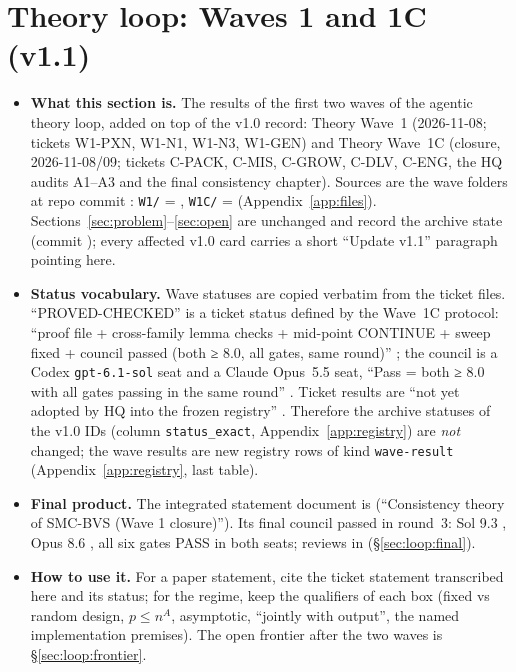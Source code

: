 \section{Theory loop: Waves 1 and 1C (v1.1)}\label{sec:loop}

\begin{agentnote}
\begin{itemize}
\item \textbf{What this section is.} The results of the first two waves of the agentic theory loop, added on top of the v1.0 record: Theory Wave~1 (2026-11-08; tickets W1-PXN, W1-N1, W1-N3, W1-GEN) and Theory Wave~1C (closure, 2026-11-08/09; tickets C-PACK, C-MIS, C-GROW, C-DLV, C-ENG, the HQ audits A1--A3 and the final consistency chapter). Sources are the wave folders at repo commit \texttt{\wavecommit}: \texttt{W1/} = , \texttt{W1C/} =  (Appendix~\ref{app:files}). Sections~\ref{sec:problem}--\ref{sec:open} are unchanged and record the archive state (commit \texttt{\sourcecommit}); every affected v1.0 card carries a short ``Update v1.1'' paragraph pointing here.
\item \textbf{Status vocabulary.} Wave statuses are copied verbatim from the ticket files. ``PROVED-CHECKED'' is a ticket status defined by the Wave~1C protocol: ``proof file + cross-family lemma checks + mid-point CONTINUE + sweep fixed + council passed (both ≥ 8.0, all gates, same round)'' ; the council is a Codex \texttt{gpt-6.1-sol} seat and a Claude Opus~5.5 seat, ``Pass = both ≥ 8.0 with all gates passing in the same round'' . Ticket results are ``not yet adopted by HQ into the frozen registry'' . Therefore the archive statuses of the v1.0 IDs (column \texttt{status\_exact}, Appendix~\ref{app:registry}) are \emph{not} changed; the wave results are new registry rows of kind \texttt{wave-result} (Appendix~\ref{app:registry}, last table).
\item \textbf{Final product.} The integrated statement document is  (``Consistency theory of SMC-BVS (Wave 1 closure)''). Its final council passed in round~3: Sol 9.3 , Opus 8.6 , all six gates PASS in both seats; reviews in  (\S\ref{sec:loop:final}).
\item \textbf{How to use it.} For a paper statement, cite the ticket statement transcribed here and its status; for the regime, keep the qualifiers of each box (fixed vs random design, $p\le n^A$, asymptotic, ``jointly with output'', the named implementation premises). The open frontier after the two waves is \S\ref{sec:loop:frontier}.
\end{itemize}
\end{agentnote}

